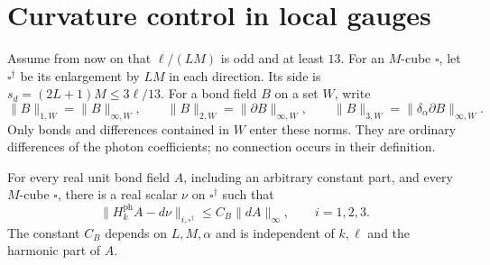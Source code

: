\documentclass[11pt,letterpaper,reqno]{amsart}
\begin{document}
\section{Curvature control in local gauges}
\label{subsec:photon-local-gauge}

Assume from now on that $\ell/(LM)$ is odd and at least $13$.
For an $M$-cube $\square$, let $\square^\dagger$ be its enlargement
by $LM$ in each direction. Its side is $s_d=(2L+1)M\le3\ell/13$.
For a bond field $B$ on a set $W$, write
\[
 \|B\|_{1,W}=\|B\|_{\infty,W},\qquad
 \|B\|_{2,W}=\|\partial B\|_{\infty,W},\qquad
 \|B\|_{3,W}=\|\delta_\alpha\partial B\|_{\infty,W}.
\]
Only bonds and differences contained in $W$ enter these norms.
They are ordinary differences of the photon coefficients; no
connection occurs in their definition.

\begin{proposition}\label{prop:photon-curvature-local-regularity}
For every real unit bond field $A$, including an arbitrary
constant part, and every $M$-cube $\square$, there is a real scalar
$\nu$ on $\square^\dagger$ such that
\begin{equation}\label{eq:photon-curvature-local-regularity}
 \|H_k^{\mathrm{ph}}A-d\nu\|_{i,\square^\dagger}
                         \le C_B\|dA\|_\infty,
                         \qquad i=1,2,3.
\end{equation}
The constant $C_B$ depends on $L,M,\alpha$ and is independent of
$k,\ell$ and the harmonic part of $A$.
\end{proposition}
\end{document}
